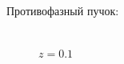\documentclass[fullscreen=true,unicode,bookmarks=true]{beamer}
\begin{document}
\begin{frame}
			Противофазный пучок:
			\vspace{-1em}
            \begin{figure}[H]
                \begin{center}
                    \begin{minipage}[h]{0.24\linewidth}
                         \\ \footnotesize{$z=0.1$} \\
                    \end{minipage}
                    \hfill
                    \begin{minipage}[h]{0.24\linewidth}

\end{minipage}
\end{center}
\end{figure}
\end{frame}
\end{document}
